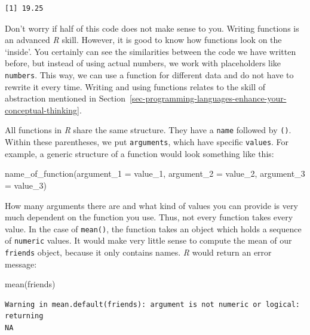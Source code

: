 \documentclass[
  letterpaper,
  DIV=11,
  numbers=noendperiod]{scrreprt}
\newenvironment{Shaded}{\begin{snugshade}}{\end{snugshade}}
\newcommand{\AttributeTok}[1]{\textcolor[rgb]{0.40,0.45,0.13}{#1}}
\newcommand{\FunctionTok}[1]{\textcolor[rgb]{0.28,0.35,0.67}{#1}}
\newcommand{\NormalTok}[1]{\textcolor[rgb]{0.00,0.23,0.31}{#1}}
\begin{document}
\begin{verbatim}
[1] 19.25
\end{verbatim}

Don't worry if half of this code does not make sense to you. Writing
functions is an advanced \emph{R} skill. However, it is good to know how
functions look on the `inside'. You certainly can see the similarities
between the code we have written before, but instead of using actual
numbers, we work with placeholders like \texttt{numbers}. This way, we
can use a function for different data and do not have to rewrite it
every time. Writing and using functions relates to the skill of
abstraction mentioned in
Section~\ref{sec-programming-languages-enhance-your-conceptual-thinking}.

All functions in \emph{R} share the same structure. They have a
\texttt{name} followed by \texttt{()}. Within these parentheses, we put
\texttt{arguments}, which have specific \texttt{values}. For example, a
generic structure of a function would look something like this:

\begin{Shaded}
\begin{Highlighting}[]
\FunctionTok{name\_of\_function}\NormalTok{(}\AttributeTok{argument\_1 =}\NormalTok{ value\_1,}
                 \AttributeTok{argument\_2 =}\NormalTok{ value\_2,}
                 \AttributeTok{argument\_3 =}\NormalTok{ value\_3)}
\end{Highlighting}
\end{Shaded}

How many arguments there are and what kind of values you can provide is
very much dependent on the function you use. Thus, not every function
takes every value. In the case of \texttt{mean()}, the function takes an
object which holds a sequence of \texttt{numeric} values. It would make
very little sense to compute the mean of our \texttt{friends} object,
because it only contains names. \emph{R} would return an error message:

\begin{Shaded}
\begin{Highlighting}[]
\FunctionTok{mean}\NormalTok{(friends)}
\end{Highlighting}
\end{Shaded}

\begin{verbatim}
Warning in mean.default(friends): argument is not numeric or logical: returning
NA
\end{verbatim}
\end{document}
